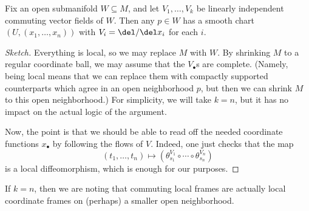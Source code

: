 \documentclass[../notes.tex]{subfiles}
\begin{document}
\begin{theorem}
	Fix an open submanifold $W\subseteq M$, and let $V_1,\ldots,V_k$ be linearly independent commuting vector fields of $W$. Then any $p\in W$ has a smooth chart $(U,(x_1,\ldots,x_n))$ with $V_i=\del/\del x_i$ for each $i$.
\end{theorem}
\begin{proof}[Sketch]
	Everything is local, so we may replace $M$ with $W$. By shrinking $M$ to a regular coordinate ball, we may assume that the $V_\bullet$s are complete. (Namely, being local means that we can replace them with compactly supported counterparts which agree in an open neighborhood $p$, but then we can shrink $M$ to this open neighborhood.) For simplicity, we will take $k=n$, but it has no impact on the actual logic of the argument.

	Now, the point is that we should be able to read off the needed coordinate functions $x_\bullet$ by following the flows of $V$. Indeed, one just checks that the map
	\[(t_1,\ldots,t_n)\mapsto\left(\theta^{V_1}_{s_1}\circ\cdots\circ\theta^{V_n}_{s_n}\right)\]
	is a local diffeomorphism, which is enough for our purposes.
\end{proof}
\begin{remark}
	If $k=n$, then we are noting that commuting local frames are actually local coordinate frames on (perhaps) a smaller open neighborhood.
\end{remark}
\end{document}
